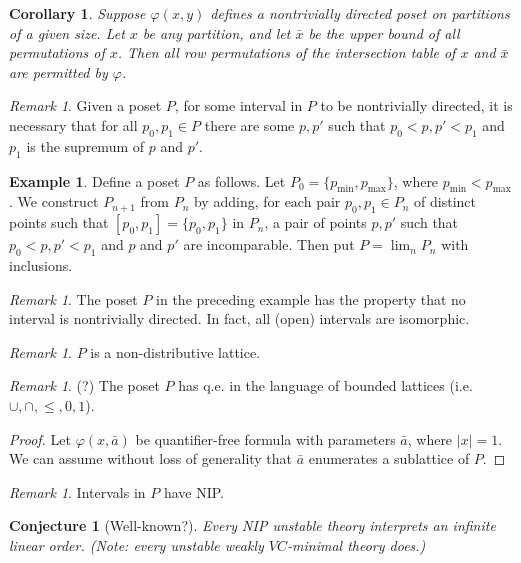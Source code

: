 \documentclass[final,a4paper,12pt]{amsart}
\newtheorem{cor}[thm]{Corollary}
\newtheorem{con}{Conjecture}
\theoremstyle{remark}
\newtheorem{rem}[thm]{Remark}
\theoremstyle{definition}
\newtheorem{ex}[thm]{Example}
\begin{document}
	\begin{cor}
		Suppose $\varphi(x,y)$ defines a nontrivially directed poset on partitions of a given size. Let $x$ be any partition, and let $\bar x$ be the upper bound of all permutations of $x$. Then all row permutations of the intersection table of $x$ and $\bar x$ are permitted by $\varphi$.
	\end{cor}
	
	\begin{rem}
		Given a poset $P$, for some interval in $P$ to be nontrivially directed, it is necessary that for all $p_0,p_1\in P$ there are some $p,p'$ such that $p_0<p,p'<p_1$ and $p_1$ is the supremum of $p$ and $p'$.
	\end{rem}
	
	\begin{ex}
		Define a poset $P$ as follows. Let $P_0=\{p_{\textrm{min}},p_{\textrm{max}}\}$, where $p_{\textrm{min}}<p_{\textrm{max}}$. We construct $P_{n+1}$ from $P_n$ by adding, for each pair $p_0,p_1\in P_n$ of distinct points such that $[p_0,p_1]=\{p_0,p_1\}$ in $P_n$, a pair of points $p,p'$ such that $p_0<p,p'<p_1$ and $p$ and $p'$ are incomparable. Then put $P=\lim_n P_n$ with inclusions.
	\end{ex}
	
	\begin{rem}
		The poset $P$ in the preceding example has the property that no interval is nontrivially directed. In fact, all (open) intervals are isomorphic.
	\end{rem}
	
	\begin{rem}
		$P$ is a non-distributive lattice.
	\end{rem}
	
	\begin{rem}(?)
		The poset $P$ has q.e. in the language of bounded lattices (i.e. $\cup,\cap,\leq,0,1$).
	\end{rem}
	\begin{proof}
		Let $\varphi(x,\bar a)$ be quantifier-free formula with parameters $\bar a$, where $\lvert x\rvert=1$. We can assume without loss of generality that $\bar a$ enumerates a sublattice of $P$.
	\end{proof}
	
	\begin{rem}
		Intervals in $P$ have NIP.
	\end{rem}
	
	\begin{con}[Well-known?]
		Every NIP unstable theory interprets an infinite linear order. (Note: every unstable weakly $VC$-minimal theory does.)
	\end{con}
	
\end{document}

